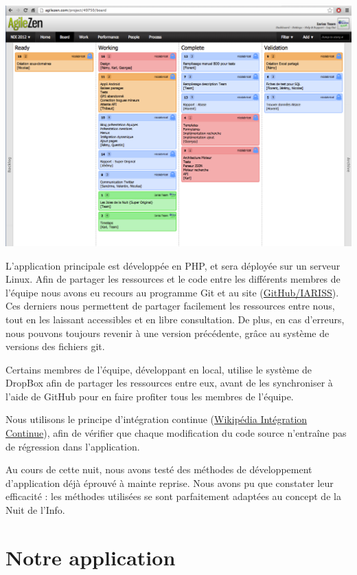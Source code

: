 \documentclass[12pt, a4paper]{article}
\newcommand{\espace}{\vspace{.8cm}}
\begin{document}
\begin{center}
\includegraphics[width=\textwidth, keepaspectratio=true]{agile.png}
\end{center}

\espace
L'application principale est développée en PHP, et sera déployée sur un serveur Linux. Afin de partager les ressources et le code entre les différents membres de l'équipe nous avons eu recours au programme Git et au site (\href{https://github.com/IARISS}{GitHub/IARISS}). Ces derniers nous permettent de partager facilement les ressources entre nous, tout en les laissant accessibles et en libre consultation. De plus, en cas d'erreurs, nous pouvons toujours revenir à une version précédente, grâce au système de versions des fichiers git.

\espace{}
Certains membres de l'équipe, développant en local, utilise le système de DropBox afin de partager les ressources entre eux, avant de les synchroniser à l'aide de GitHub pour en faire profiter tous les membres de l'équipe.

Nous utilisons le principe d'intégration continue (\href{http://fr.wikipedia.org/wiki/Int%C3%A9gration_continue}{Wikipédia Intégration Continue}), afin de vérifier que chaque modification du code source n'entraîne pas de régression dans l'application.

Au cours de cette nuit, nous avons testé des méthodes de développement d'application déjà éprouvé à mainte reprise. Nous avons pu que constater leur efficacité : les méthodes utilisées se sont parfaitement adaptées au concept de la Nuit de l'Info.

\espace{}
\section*{Notre application}
\end{document}
